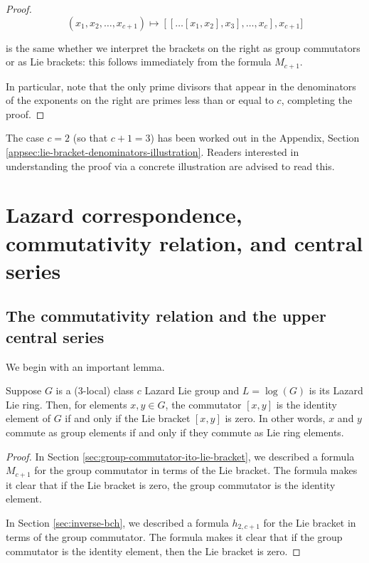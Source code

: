 \begin{proof}
$$(x_1,x_2,\dots,x_{c+1}) \mapsto [[ \dots [x_1,x_2],x_3],\dots,x_c],x_{c+1}]$$

is the same whether we interpret the brackets on the right as group
commutators or as Lie brackets: this follows immediately from the
formula $M_{c+1}$.

 In particular, note that the only prime divisors that appear in the
 denominators of the exponents on the right are primes less than or
 equal to $c$, completing the proof.
\end{proof}

The case $c = 2$ (so that $c + 1 = 3$) has been worked out in the
Appendix, Section
\ref{appsec:lie-bracket-denominators-illustration}. Readers interested
in understanding the proof via a concrete illustration are advised to
read this.

\section{Lazard correspondence, commutativity relation, and central series}\label{sec:lazard-correspondence-commutativity-relation-central-series}

\subsection{The commutativity relation and the upper central series}

We begin with an important lemma.

\begin{lemma}\label{lemma:commutativity-relation-same-group-lie-ring}
  Suppose $G$ is a ($3$-local) class $c$ Lazard Lie group and $L =
  \log(G)$ is its Lazard Lie ring. Then, for elements $x,y \in G$, the
  commutator $[x,y]$ is the identity element of $G$ if and only if the
  Lie bracket $[x,y]$ is zero. In other words, $x$ and $y$ commute as
  group elements if and only if they commute as Lie ring elements.
\end{lemma}

\begin{proof}
  In Section \ref{sec:group-commutator-ito-lie-bracket}, we described
  a formula $M_{c+1}$ for the group commutator in terms of the Lie
  bracket. The formula makes it clear that if the Lie bracket is zero,
  the group commutator is the identity element.

  In Section \ref{sec:inverse-bch}, we described a formula $h_{2,c+1}$
  for the Lie bracket in terms of the group commutator. The formula
  makes it clear that if the group commutator is the identity element,
  then the Lie bracket is zero.
\end{proof}

